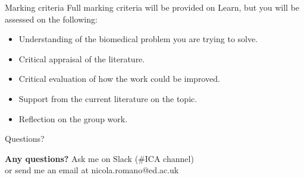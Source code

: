 \documentclass[9pt, aspectratio=169]{beamer}
\begin{document}
\begin{frame}
    {Marking criteria}
    Full marking criteria will be provided on Learn, but you will be assessed on the following:

    \begin{itemize}
        \item Understanding of the biomedical problem you are trying to solve.
        \item Critical appraisal of the literature.
        \item Critical evaluation of how the work could be improved.
        \item Support from the current literature on the topic.
        \item Reflection on the group work.
    \end{itemize}
\end{frame}

\begin{frame}
    {Questions?}

    \centering
    \huge
    \textbf{Any questions?}
    Ask me on Slack (\#ICA channel)\\or send me an email at nicola.romano@ed.ac.uk
\end{frame}
\end{document}
